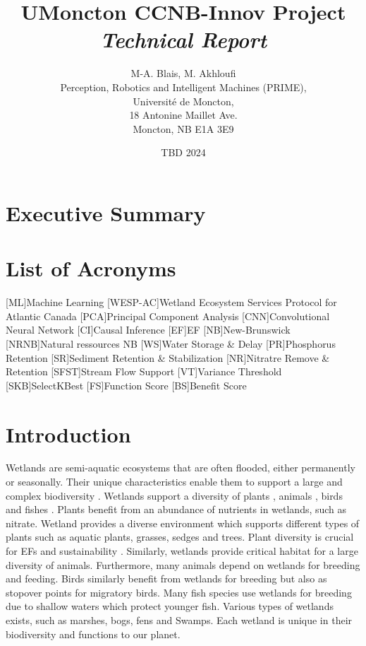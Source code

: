 \documentclass[12pt,letterpaper]{article}
\title{\textbf{UMoncton CCNB-Innov Project} 
\textit{Technical Report}}
\author{M-A. Blais, M. Akhloufi \\
Perception, Robotics and Intelligent Machines (PRIME), \\
Université de Moncton, \\
18 Antonine Maillet Ave. \\
Moncton, NB E1A 3E9}
\date{TBD 2024}
\begin{document}
\maketitle
\thispagestyle{empty}



\clearpage 
\thispagestyle{plain}
\tableofcontents %

\section*{Executive Summary}

\clearpage
\printglossaries

\clearpage
\section*{List of Acronyms}
\begin{acronym}
[ML]{Machine Learning}
[WESP-AC]{Wetland Ecosystem Services Protocol for Atlantic Canada}
[PCA]{Principal Component Analysis}
[CNN]{Convolutional Neural Network}
[CI]{Causal Inference}
[EF]{\ac{EF}}
[NB]{New-Brunswick}
[NRNB]{Natural ressources NB}
[WS]{Water Storage \& Delay}
[PR]{Phosphorus Retention}
[SR]{Sediment Retention \& Stabilization}
[NR]{Nitratre Remove \& Retention}
[SFST]{Stream Flow Support}
[VT]{Variance Threshold}
[SKB]{SelectKBest}
[FS]{Function Score}
[BS]{Benefit Score}


\end{acronym}



\section{Introduction}

Wetlands are semi-aquatic ecosystems that are often flooded, either permanently or seasonally.
Their unique characteristics enable them to support a large and complex biodiversity \cite{junk2006comparative}.
Wetlands support a diversity of plants \cite{pott2011plant}, animals \cite{wetlands_conservancy}, birds \cite{kavcergyte2021evaluating} and fishes \cite{das2018fish}.
Plants benefit from an abundance of nutrients in wetlands, such as nitrate.
Wetland provides a diverse environment which supports different types of plants such as aquatic plants, grasses, sedges and trees.
Plant diversity is crucial for \acf{EF}s and sustainability \cite{grime1998benefits}.
Similarly, wetlands provide critical habitat for a large diversity of animals.
Furthermore, many animals depend on wetlands for breeding and feeding.
Birds similarly benefit from wetlands for breeding but also as stopover points for migratory birds.
Many fish species use wetlands for breeding due to shallow waters which protect younger fish.
Various types of wetlands exists, such as marshes, bogs, fens and Swamps.
Each wetland is unique in their biodiversity and functions to our planet.
\end{document}
